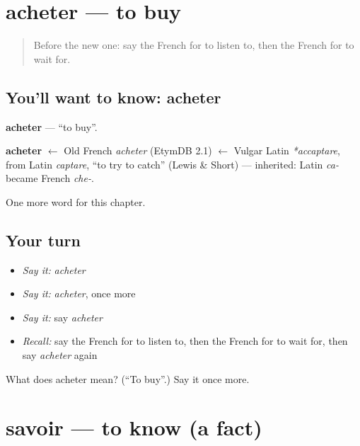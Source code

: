 \section[acheter]{acheter — to buy}

\label{lesson:FR-C64-acheter}



\begin{quote}
Before the new one: say the French for to listen to, then the French for to wait for.
\end{quote}

\subsection*{You'll want to know: acheter}
\textbf{acheter} — \textquotedblleft{}to buy\textquotedblright{}.

\begin{cousinweb}
\textbf{acheter} $\leftarrow$ Old French \emph{acheter} (EtymDB 2.1) $\leftarrow$ Vulgar Latin \emph{*accaptare}, from Latin \emph{captare}, \textquotedblleft{}to try to catch\textquotedblright{} (Lewis \& Short) — inherited: Latin \emph{ca-} became French \emph{che-}.
\end{cousinweb}

\begin{grammarlens}[title={What you've built}]
One more word for this chapter.
\end{grammarlens}

\subsection*{Your turn}
\begin{itemize}
\raggedright
  \item \emph{Say it:} \emph{acheter}
  \item \emph{Say it:} \emph{acheter}, once more
  \item \emph{Say it:} say \emph{acheter}
  \item \emph{Recall:} say the French for to listen to, then the French for to wait for, then say \emph{acheter} again
\end{itemize}

\begin{tcolorbox}[breakable,colback=teal!4,colframe=teal!35!black,title={Before you move on}]
What does acheter mean? (\textquotedblleft{}To buy\textquotedblright{}.) Say it once more.
\end{tcolorbox}
\section[savoir]{savoir — to know (a fact)}

